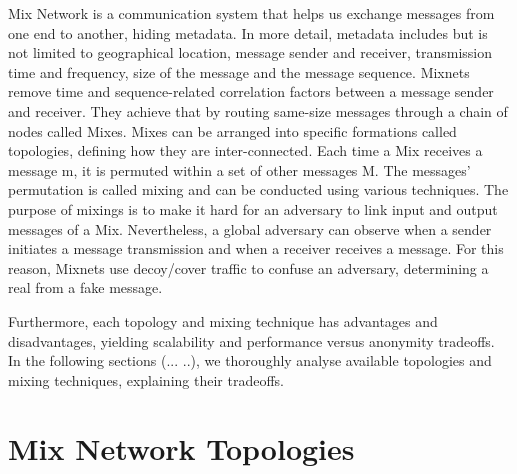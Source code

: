 \documentclass[logo,msc,cyber]{infthesis}   %
\begin{document}
Mix Network is a communication system that helps us exchange messages from one
end to another, hiding metadata. In more detail, metadata includes but is not
limited to geographical location, message sender and receiver, transmission time
and frequency, size of the message and the message sequence. Mixnets remove time
and sequence-related correlation factors between a message sender and receiver.
They achieve that by routing same-size messages through a chain of nodes called
Mixes. Mixes can be arranged into specific formations called topologies,
defining how they are inter-connected. Each time a Mix receives a message m, it
is permuted within a set of other messages M. The messages' permutation is
called mixing and can be conducted using various techniques. The purpose of
mixings is to make it hard for an adversary to link input and output messages of
a Mix. Nevertheless, a global adversary can observe when a sender initiates a
message transmission and when a receiver receives a message. For this reason,
Mixnets use decoy/cover traffic to confuse an adversary, determining a real from
a fake message. 

Furthermore, each topology and mixing technique has advantages and
disadvantages, yielding scalability and performance versus anonymity tradeoffs.
In the following sections (... ..), we thoroughly analyse available topologies
and mixing techniques, explaining their tradeoffs.

\section{Mix Network Topologies}
\end{document}
